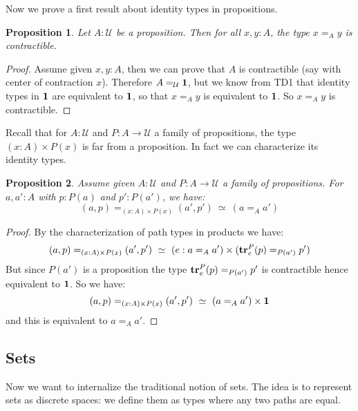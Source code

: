 \documentclass{article}
\newcommand{\sse}[1]{\medbreak \subsection{#1}}
\newcommand{\U}{{\mathcal U}}
\renewcommand{\r}{\rightarrow}
\newcommand{\tr}{\mathrm{\bf tr}}
\newcommand{\one}{{\bf 1}}
\newtheorem{proposition}{Proposition}
\begin{document}
Now we prove a first result about identity types in propositions.

\begin{proposition}
Let $A:\U$ be a proposition. Then for all $x,y:A$, the type $x=_Ay$ is contractible.
\end{proposition}
\begin{proof}
Assume given $x,y:A$, then we can prove that $A$ is contractible (say with center of contraction $x$). Therefore $A=_\U\one$, but we know from TD1 that identity types in $\one$ are equivalent to $\one$, so that $x=_A y$ is equivalent to $\one$. So $x=_Ay$  is contractible.
\end{proof}

Recall that for $A:\U$ and $P:A\r \U$ a family of propositions, the type $(x:A)\times P(x)$ is far from a proposition. In fact we can characterize its identity types.

\begin{proposition}
Assume given $A:\U$ and $P:A\r \U$ a family of propositions. For $a,a':A$ with $p:P(a)$ and $p':P(a')$, we have:
\[(a,p)=_{(x:A)\times P(x)} (a',p')\ \simeq \ (a=_Aa')\]
\end{proposition}
\begin{proof}
By the characterization of path types in products we have:
\[(a,p)=_{(x:A)\times P(x)} (a',p')\ \simeq \ (e:a=_Aa')\times(\tr^P_e(p) =_{P(a')} p') \]
But since $P(a')$ is a proposition the type $\tr^P_e(p) =_{P(a')} p'$ is contractible hence equivalent to $\one$. So we have:
\[(a,p)=_{(x:A)\times P(x)} (a',p')\ \simeq \ (a=_Aa')\times \one\]
and this is equivalent to $a=_Aa'$.
\end{proof}






\sse{Sets}

Now we want to internalize the traditional notion of sets. The idea is to represent sets as discrete spaces: we define them as types where any two paths are equal.
\end{document}
